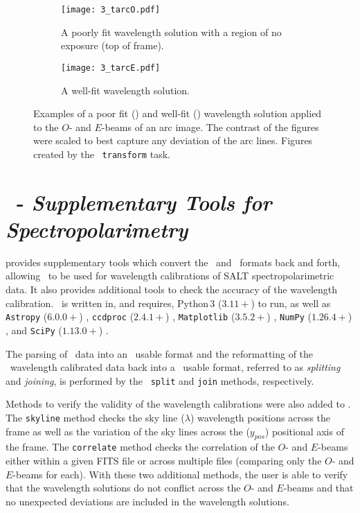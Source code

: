 \begin{figure}[t]
    \centering
    \begin{subfigure}[b]{1.0 \textwidth}
        \centering
        \texttt{[image: 3\_tarcO.pdf]}
        \caption{A poorly fit wavelength solution with a region of no exposure (top of frame).}
        \label{subfig:trans_O}
    \end{subfigure}
    \centering
    \begin{subfigure}[b]{1.0\textwidth}
        \centering
        \texttt{[image: 3\_tarcE.pdf]}
        \caption{A well-fit wavelength solution.}
        \label{subfig:trans_E}
    \end{subfigure}
    \caption{
        Examples of a poor fit () and well-fit () wavelength solution applied to the $O$- and $E$-beams of an arc image.
        The contrast of the figures were scaled to best capture any deviation of the arc lines.
        Figures created by the \iraf\ \texttt{transform} task.
    }
    \label{fig:iraf_trans_plot}
\end{figure}

\section[\textsc{stops}]{\stops\ - \textit{Supplementary Tools for \polsalt\\Spectropolarimetry}} \label{sec:stops}

 provides supplementary tools which convert the \polsalt\ and \iraf\ formats back and forth, allowing \iraf\ to be used for wavelength calibrations of \gls{SALT} spectropolarimetric data.
It also provides additional tools to check the accuracy of the wavelength calibration.
\stops\ is written in, and requires, Python\,$3$ ($3.11+$) to run, as well as \texttt{Astropy} ($6.0.0+$) \citep{astropy:2013, astropy:2018, astropy:2022}, \texttt{ccdproc} ($2.4.1+$) \citep{ccdproc}, \texttt{Matplotlib} ($3.5.2+$) \citep{matplotlib}, \texttt{NumPy} ($1.26.4+$) \citep{numpy}, and \texttt{SciPy} ($1.13.0+$) \citep{scipy}.

The parsing of \polsalt\ data into an \iraf\ usable format and the reformatting of the \iraf\ wavelength calibrated data back into a \polsalt\ usable format, referred to as \textit{splitting} and \textit{joining}, is performed by the \stops\ \texttt{split} and \texttt{join} methods, respectively.

Methods to verify the validity of the wavelength calibrations were also added to \stops.
The \texttt{skyline} method checks the sky line ($\lambda$) wavelength positions across the frame as well as the variation of the sky lines across the ($y_{pos}$) positional axis of the frame.
The \texttt{correlate} method checks the correlation of the $O$- and $E$-beams either within a given \gls{FITS} file or across multiple files (comparing only the $O$- and $E$-beams for each).
With these two additional methods, the user is able to verify that the wavelength solutions do not conflict across the $O$- and $E$-beams and that no unexpected deviations are included in the wavelength solutions.

